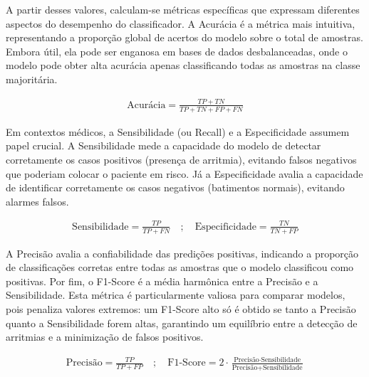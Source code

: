A partir desses valores, calculam-se métricas específicas que expressam diferentes aspectos do desempenho do classificador. A Acurácia é a métrica mais 
intuitiva, representando a proporção global de acertos do modelo sobre o total de amostras. Embora útil, ela pode ser enganosa em bases de dados 
desbalanceadas, onde o modelo pode obter alta acurácia apenas classificando todas as amostras na classe majoritária.

\begin{align}
    \label{eq: eq9}
    \text{Acurácia} = \frac{TP + TN}{TP + TN + FP + FN}
\end{align}

Em contextos médicos, a Sensibilidade (ou Recall) e a Especificidade assumem papel crucial. A Sensibilidade mede a capacidade do modelo de detectar 
corretamente os casos positivos (presença de arritmia), evitando falsos negativos que poderiam colocar o paciente em risco. Já a Especificidade avalia 
a capacidade de identificar corretamente os casos negativos (batimentos normais), evitando alarmes falsos.

\begin{align}
    \label{eq: eq10}
    \text{Sensibilidade} = \frac{TP}{TP + FN} \quad ; \quad \text{Especificidade} = \frac{TN}{TN + FP}
\end{align}

A Precisão avalia a confiabilidade das predições positivas, indicando a proporção de classificações corretas entre todas as amostras que o modelo 
classificou como positivas. Por fim, o F1-Score é a média harmônica entre a Precisão e a Sensibilidade. Esta métrica é particularmente valiosa para 
comparar modelos, pois penaliza valores extremos: um F1-Score alto só é obtido se tanto a Precisão quanto a Sensibilidade forem altas, garantindo um 
equilíbrio entre a detecção de arritmias e a minimização de falsos positivos.

\begin{align}
    \label{eq: eq11}
    \text{Precisão} = \frac{TP}{TP + FP} \quad ; \quad \text{F1-Score} = 2 \cdot \frac{\text{Precisão} \cdot \text{Sensibilidade}}{\text{Precisão} + \text{Sensibilidade}}
\end{align}